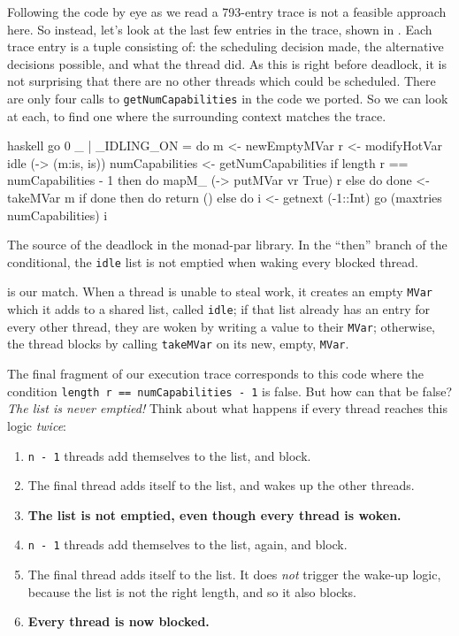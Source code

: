 Following the code by eye as we read a 793-entry trace is not a
feasible approach here.  So instead, let's look at the last few
entries in the trace, shown in .  Each
trace entry is a tuple consisting of: the scheduling decision made,
the alternative decisions possible, and what the thread did.  As this
is right before deadlock, it is not surprising that there are no other
threads which could be scheduled.  There are only four calls to
\verb|getNumCapabilities| in the code we ported.  So we can look at
each, to find one where the surrounding context matches the trace.

\begin{listing}
\centering
\begin{cminted}{haskell}
go 0 _ | _IDLING_ON =
  do m <- newEmptyMVar
     r <- modifyHotVar idle (\is -> (m:is, is))
     numCapabilities <- getNumCapabilities
     if length r == numCapabilities - 1
       then do
         mapM_ (\vr -> putMVar vr True) r
       else do
         done <- takeMVar m
         if done
           then do
             return ()
           else do
             i <- getnext (-1::Int)
             go (maxtries numCapabilities) i
\end{cminted}
\caption[The source of the deadlock in the monad-par library.]{The source of the deadlock in the monad-par library.  In the ``then'' branch of the conditional, the \texttt{idle} list is not emptied when waking every blocked thread.}\label{lst:parmonad_example4}
\end{listing}

 is our match.  When a thread is unable to
steal work, it creates an empty \verb|MVar| which it adds to a shared
list, called \verb|idle|; if that list already has an entry for every
other thread, they are woken by writing a value to their \verb|MVar|;
otherwise, the thread blocks by calling \verb|takeMVar| on its new,
empty, \verb|MVar|.

The final fragment of our execution trace corresponds to this code
where the condition \verb|length r == numCapabilities - 1| is false.
But how can that be false?  \emph{The list is never emptied!}  Think
about what happens if every thread reaches this logic \emph{twice}:

\begin{enumerate}
\item \verb|n - 1| threads add themselves to the list, and block.
\item The final thread adds itself to the list, and wakes up the other
  threads.
\item \textbf{The list is not emptied, even though every thread is woken.}
\item \verb|n - 1| threads add themselves to the list, again, and
  block.
\item The final thread adds itself to the list.  It does \emph{not}
  trigger the wake-up logic, because the list is not the right length,
  and so it also blocks.
\item \textbf{Every thread is now blocked.}
\end{enumerate}

